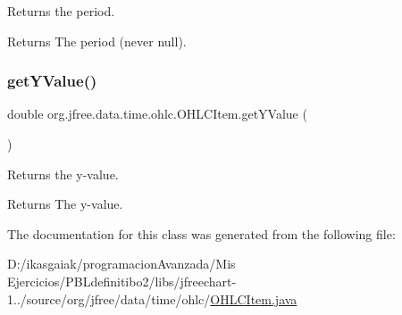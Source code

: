 Returns the period.

\begin{DoxyReturn}{Returns}
The period (never {\ttfamily null}). 
\end{DoxyReturn}
\mbox{\label{classorg_1_1jfree_1_1data_1_1time_1_1ohlc_1_1_o_h_l_c_item_abdc816c219bd9d79923f93ced894ddfa}} 
\subsubsection{\texorpdfstring{get\+Y\+Value()}{getYValue()}}
{\footnotesize\ttfamily double org.\+jfree.\+data.\+time.\+ohlc.\+O\+H\+L\+C\+Item.\+get\+Y\+Value (\begin{DoxyParamCaption}{ }\end{DoxyParamCaption})}

Returns the y-\/value.

\begin{DoxyReturn}{Returns}
The y-\/value. 
\end{DoxyReturn}


The documentation for this class was generated from the following file\+:\begin{DoxyCompactItemize}
\item 
D\+:/ikasgaiak/programacion\+Avanzada/\+Mis Ejercicios/\+P\+B\+Ldefinitibo2/libs/jfreechart-\/1../source/org/jfree/data/time/ohlc/\mbox{\hyperlink{_o_h_l_c_item_8java}{O\+H\+L\+C\+Item.\+java}}\end{DoxyCompactItemize}
